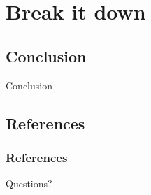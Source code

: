 \documentclass{beamer}
\begin{document}
\section{Break it down}

	\subsection{Conclusion}
	\begin{frame}
	\Huge{\centerline{Conclusion}}
	\end{frame}

	\subsection{References}
	\begin{frame}[allowframebreaks]
		\frametitle{References}
		
		
	\end{frame}

	\begin{frame}
	\Huge{\centerline{Questions?}}
	\end{frame}
\end{document}
